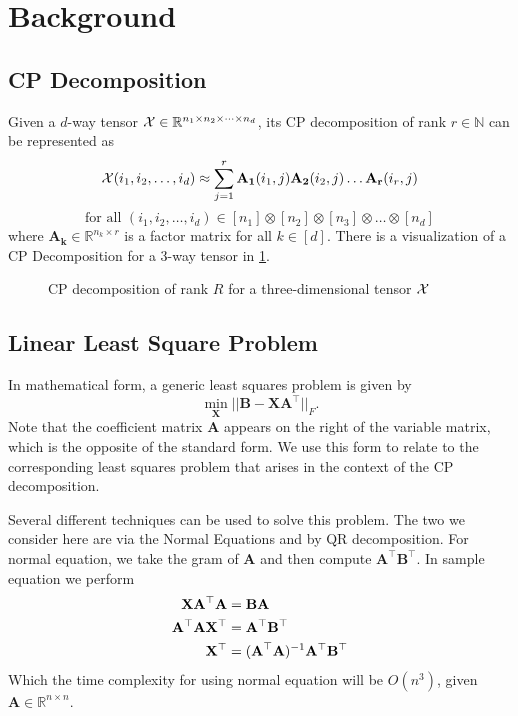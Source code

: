 \documentclass{article}
\newcommand{\mat}[1]{\mathbf{#1}}
\newcommand{\M}[2][]{\bm{#1{\mathbf{\MakeUppercase{#2}}}}} 		%
\newcommand{\T}[2][]{#1{\mathbf{\cal{#2}}}} 						%
\begin{document}
\section{Background}
\subsection{CP Decomposition}
Given a $d$-way tensor $\T{X} \in \mathbb{R}^{n_1\times n_2\times \dots \times n_d}$, its
CP decomposition of rank $r \in \mathbb{N}$ can be represented as 
$$\T{X}(i_1,i_2,\dots, i_d) \approx \sum^{r}_{j=1}\mat{A_1}(i_1,j)\mat{A_2}(i_2,j) \dots \mat{A_r}(i_r,j)$$
$$\text{for all } (i_1,i_2,\dots, i_d) \in [n_1] \otimes [n_2] \otimes [n_3] \otimes \dots \otimes [n_d]$$
where $\mat{A_k} \in \mathbb{R}^{n_k \times r}$ is a factor matrix for all $k \in [d]$. 
There is a visualization of a CP Decomposition for a 3-way tensor in \cref{fig:3d-cp-decomp}.

\begin{figure}[ht!]
\centering

\caption{CP decomposition of rank $R$ for a three-dimensional tensor $\T{X}$ \label{fig:3d-cp-decomp}}
\end{figure}

\subsection{Linear Least Square Problem}
In mathematical form, a generic least squares problem is given by 
$$\min_{\mat{X}}||\mat{B} - \mat{X}\mat{A}^\top||_{F}.$$
Note that the coefficient matrix $\mat{A}$ appears on the right of the variable matrix, which is the opposite of the standard form.
We use this form to relate to the corresponding least squares problem that arises in the context of the CP decomposition.

Several different techniques can be used to solve this problem.
The two we consider here are via the Normal Equations and by QR decomposition.
For normal equation, we take the gram of $\mat{A}$ and then compute $\mat{A}^\top\mat{B}^\top$. In sample equation we perform
\begin{align}
\mat{X}\mat{A}^\top\mat{A} &= \mat{B}\mat{A} \nonumber \\
\mat{A}^\top\mat{A}\mat{X}^\top &= \mat{A}^\top\mat{B}^\top \nonumber \\
\mat{X}^\top &= (\M{A}^\top\mat{A})^{-1}\mat{A}^\top\mat{B}^\top \nonumber
\end{align}
Which the time complexity for using normal equation will be $O(n^3)$, given $\mat{A} \in \mathbb{R}^{n \times n}$.
\end{document}
